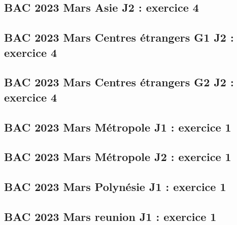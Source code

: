 \documentclass[lang=fr,edition=teacher,layout=sheet]{mxbook}
\begin{document}
\begingroup\endgroup
\par\bigskip
{}\subsection*{BAC 2023 Mars Asie J2 : exercice 4}
\begingroup\endgroup
\par\bigskip
{}\subsection*{BAC 2023 Mars Centres étrangers G1 J2 : exercice 4}
\begingroup\endgroup
\par\bigskip
{}\subsection*{BAC 2023 Mars Centres étrangers G2 J2 : exercice 4}
\begingroup\endgroup
\par\bigskip
{}\subsection*{BAC 2023 Mars Métropole J1 : exercice 1}
\begingroup\endgroup
\par\bigskip
{}\subsection*{BAC 2023 Mars Métropole J2 : exercice 1}
\begingroup\endgroup
\par\bigskip
{}\subsection*{BAC 2023 Mars Polynésie J1 : exercice 1}
\begingroup\endgroup
\par\bigskip
{}\subsection*{BAC 2023 Mars reunion J1 : exercice 1}
\end{document}
